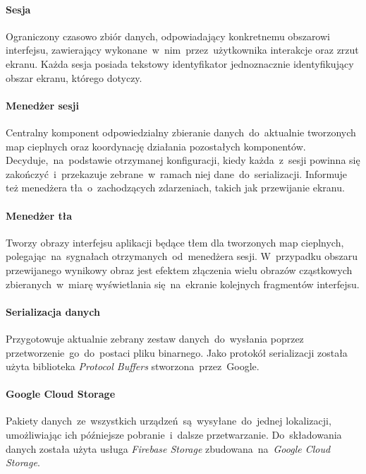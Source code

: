 \paragraph{Sesja}
\label{par:rs_session}
Ograniczony czasowo zbiór danych, odpowiadający konkretnemu obszarowi interfejsu, zawierający wykonane~w~nim~przez~użytkownika interakcje oraz zrzut ekranu. Każda sesja posiada tekstowy identyfikator jednoznacznie identyfikujący obszar ekranu, którego dotyczy.

\paragraph{Menedżer sesji} 
\label{par:rs_session_manager}
Centralny komponent odpowiedzialny zbieranie danych~do~aktualnie tworzonych map cieplnych oraz koordynację działania pozostałych komponentów. Decyduje,~na~podstawie otrzymanej konfiguracji, kiedy każda~z~sesji powinna się zakończyć~i~przekazuje zebrane~w~ramach niej dane~do~serializacji. Informuje też menedżera tła~o~zachodzących zdarzeniach, takich jak przewijanie ekranu.

\paragraph{Menedżer tła} 
\label{par:rs_bg_manager}
Tworzy obrazy interfejsu aplikacji będące tłem dla tworzonych map cieplnych, polegając~na~sygnałach otrzymanych~od~menedżera sesji. W~przypadku obszaru przewijanego wynikowy obraz jest efektem złączenia wielu  obrazów cząstkowych zbieranych~w~miarę wyświetlania się~na~ekranie kolejnych fragmentów interfejsu.

\paragraph{Serializacja danych}
Przygotowuje aktualnie zebrany zestaw danych~do~wysłania poprzez przetworzenie~go~do~postaci pliku binarnego. Jako protokół serializacji została użyta biblioteka {\it Protocol Buffers} stworzona~przez~Google.

\paragraph{Google Cloud Storage}
Pakiety danych~ze~wszystkich urządzeń~są~wysyłane~do~jednej lokalizacji, umożliwiając ich późniejsze pobranie~i~dalsze przetwarzanie. Do~składowania danych została użyta usługa {\it Firebase Storage} zbudowana~na~{\it Google Cloud Storage}.

